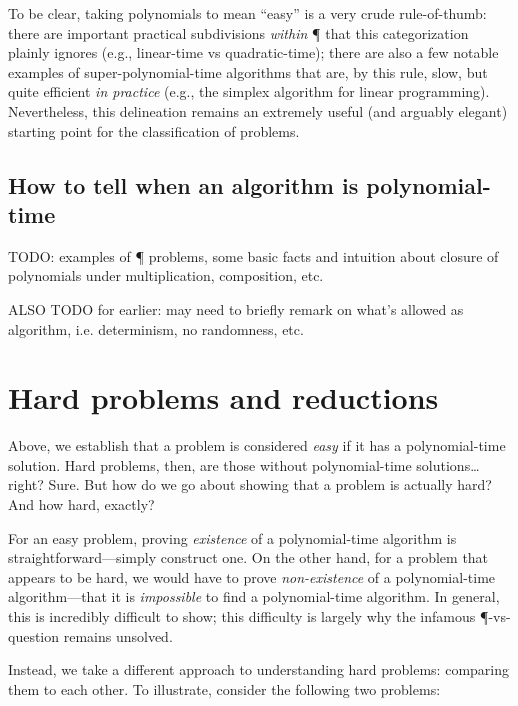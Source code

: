 To be clear, taking polynomials to mean ``easy'' is a very crude rule-of-thumb:
there are important practical subdivisions \emph{within} \P{} that this
categorization plainly ignores (e.g., linear-time vs quadratic-time); there are
also a few notable examples of super-polynomial-time algorithms that are, by
this rule, slow, but quite efficient \emph{in practice} (e.g., the simplex
algorithm for linear programming).  Nevertheless, this delineation remains an
extremely useful (and arguably elegant) starting point for the classification
of problems.

\subsection{How to tell when an algorithm is polynomial-time}

TODO: examples of \P{} problems, some basic facts and intuition about closure
of polynomials under multiplication, composition, etc.

ALSO TODO for earlier: may need to briefly remark on what's allowed as
algorithm, i.e. determinism, no randomness, etc.


\section{Hard problems and reductions}

Above, we establish that a problem is considered \emph{easy} if it has a
polynomial-time solution.  Hard problems, then, are those without
polynomial-time solutions… right?  Sure.  But how do we go about showing that a
problem is actually hard?  And how hard, exactly?

For an easy problem, proving \emph{existence} of a polynomial-time algorithm is
straightforward---simply construct one.  On the other hand, for a problem that
appears to be hard, we would have to prove \emph{non-existence} of a
polynomial-time algorithm---that it is \emph{impossible} to find a
polynomial-time algorithm. In general, this is incredibly difficult to show;
this difficulty is largely why the infamous \P-vs-\NP{} question remains
unsolved.

Instead, we take a different approach to understanding hard problems: comparing
them to each other.  To illustrate, consider the following two problems:


